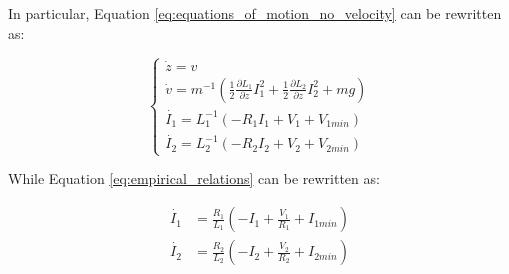 In particular, Equation \ref{eq:equations_of_motion_no_velocity} can be rewritten as:

\begin{equation}
    \begin{cases}
        \dot{z} = v                                                                                                                                 \\
        \dot{v} = m^{-1} \left(\frac{1}{2} \frac{\partial L_1}{\partial z} I_1^2 + \frac{1}{2} \frac{\partial L_2}{\partial z} I_2^2 + m g  \right) \\
        \dot{I_1} = L_1^{-1} \left(- R_1 I_1 + V_1 + V_{1min} \right)                                                                               \\
        \dot{I_2} = L_2^{-1} \left(- R_2 I_2 + V_2 + V_{2min} \right)
    \end{cases}
    \label{eq:equations_of_motion_no_velocity_final}
\end{equation}

While Equation \ref{eq:empirical_relations} can be rewritten as:

\begin{equation}
    \begin{aligned}
        \dot{I_1} & = \frac{R_1}{L_1} \left(- I_1 + \frac{V_1}{R_1} + I_{1min} \right) \\
        \dot{I_2} & = \frac{R_2}{L_2} \left(- I_2 + \frac{V_2}{R_2} + I_{2min} \right)
    \end{aligned}
\end{equation}